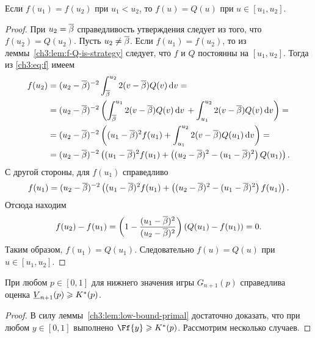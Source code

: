 {\begin{lemma}
  \label{ch3:lem:f=Q}
  Если $f(u_1) = f(u_2)$ при $u_1 < u_2$, то $f(u) = Q(u)$ при $u \in [u_1, u_2]$.
\end{lemma}
\begin{proof}
  При $u_2 = {{\overline{\beta}}}$ справедливость утверждения следует из того, что $f(u_2) = Q(u_2)$.
  Пусть $u_2 \neq {{\overline{\beta}}}$. 
  Если $f(u_1) = f(u_2)$, то из леммы~\ref{ch3:lem:f-Q-is-strategy} следует, что $f$ и $Q$ постоянны на $[u_1, u_2]$.
  Тогда из \eqref{ch3:eq:f} имеем
  \begin{align*}
    f(u_2)
    &= (u_2 - {{\overline{\beta}}})^{-2} \int_{{{\overline{\beta}}}}^{u_2} 2 (v - {{\overline{\beta}}}) Q(v) \mathop{}\!\mathrm{d} v = \\
    &= (u_2 - {{\overline{\beta}}})^{-2} \left(
      \int_{{{\overline{\beta}}}}^{u_1} 2 (v - {{\overline{\beta}}}) Q(v) \mathop{}\!\mathrm{d} v \, +
      \int_{u_1}^{u_2} 2 (v - {{\overline{\beta}}}) Q(v) \mathop{}\!\mathrm{d} v
      \right) = \\
    &= (u_2 - {{\overline{\beta}}})^{-2} \left(
      (u_1 - {{\overline{\beta}}})^2 f(u_1) +
      \int_{u_1}^{u_2} 2 (v - {{\overline{\beta}}}) Q(u_1) \mathop{}\!\mathrm{d} v
      \right) = \\
    &= (u_2 - {{\overline{\beta}}})^{-2} \left(
      (u_1 - {{\overline{\beta}}})^2 f(u_1) +
      \left( (u_2 - {{\overline{\beta}}})^2 - (u_1 - {{\overline{\beta}}})^2 \right) Q(u_1)
      \right).
  \end{align*}
  С другой стороны, для $f(u_1)$ справедливо
  \begin{equation*}
    f(u_1) = (u_2 - {{\overline{\beta}}})^{-2} \left(
      (u_1 - {{\overline{\beta}}})^2 f(u_1) +
      \left( (u_2 - {{\overline{\beta}}})^2 - (u_1 - {{\overline{\beta}}})^2 \right) f(u_1)
    \right).
  \end{equation*}
  Отсюда находим
  \begin{equation*}
    f(u_2) - f(u_1) = \left(1 - \frac{(u_1 - {{\overline{\beta}}})^2}{(u_2 - {{\overline{\beta}}})^2}\right)(Q(u_1) - f(u_1)) = 0.
  \end{equation*}
  Таким образом, $f(u_1) = Q(u_1)$.
  Следовательно $f(u) = Q(u)$ при $u \in [u_1, u_2]$.
\end{proof}

\begin{theorem}\label{ch3:thm:V-bound}
  При любом $p \in [0, 1]$ для нижнего значения игры $G_{n+1}(p)$ справедлива оценка $\LV{n+1}(p) \geqslant K^*(p)$.
\end{theorem}
\begin{proof}
  В силу леммы~\ref{ch3:lem:low-bound-primal} достаточно доказать, что при любом $y \in [0, 1]$ выполнено $\Ff{y} \geqslant K^*(p)$.
  Рассмотрим несколько случаев.


\end{proof}}
